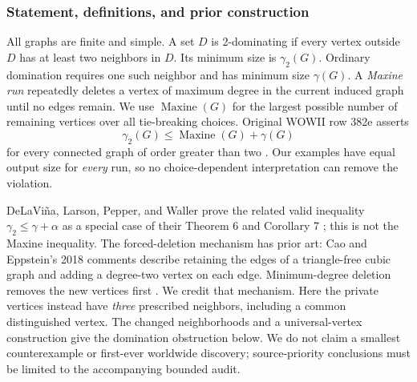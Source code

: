 \documentclass[11pt,a4paper]{article}
\theoremstyle{definition}\newtheorem{definition}[theorem]{Definition}
\theoremstyle{remark}\newtheorem{remark}[theorem]{Remark}
\begin{document}
\subsubsection{Statement, definitions, and prior construction}
All graphs are finite and simple. A set $D$ is 2-dominating if every
vertex outside $D$ has at least two neighbors in $D$. Its minimum size
is $\gamma_2(G)$. Ordinary domination requires one such neighbor and has
minimum size $\gamma(G)$. A \emph{Maxine run} repeatedly deletes a vertex
of maximum degree in the current induced graph until no edges remain.
We use $\operatorname{Maxine}(G)$ for the largest possible number of remaining vertices
over all tie-breaking choices. Original WOWII row 382e asserts
\begin{equation}\label{late:382e:eq:target}
 \gamma_2(G)\leq\operatorname{Maxine}(G)+\gamma(G)
\end{equation}
for every connected graph of order greater than two \cite{src:catalogue}.
Our examples have equal output size for \emph{every} run, so no
choice-dependent interpretation can remove the violation.

DeLaVi\~na, Larson, Pepper, and Waller prove the related valid inequality
$\gamma_2\leq\gamma+\alpha$ as a special case of their Theorem 6 and
Corollary 7 \cite{early:dpw-two}; this is not the Maxine inequality.
The forced-deletion mechanism has prior art: Cao and Eppstein's 2018
comments describe retaining the edges of a triangle-free cubic graph
and adding a degree-two vertex on each edge. Minimum-degree deletion
removes the new vertices first \cite{late:382e:ce}. We credit that mechanism.
Here the private vertices instead have \emph{three} prescribed neighbors,
including a common distinguished vertex. The changed neighborhoods and
a universal-vertex construction give the domination obstruction below.
We do not claim a smallest counterexample or first-ever worldwide discovery;
source-priority conclusions must be limited to the accompanying bounded audit.
\end{document}
